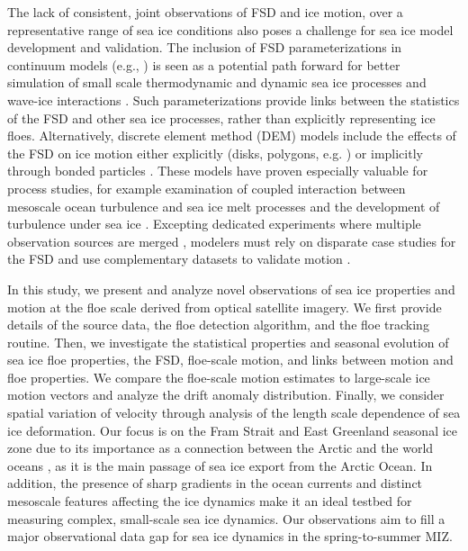 \documentclass[review, jog]{igs}
\begin{document}
The lack of consistent, joint observations of FSD and ice motion, over a representative range of sea ice conditions also poses a challenge for sea ice model development and validation.
The inclusion of FSD parameterizations in continuum models (e.g., \cite{hunke1997_ElasticViscous}) is seen as a potential path forward for better simulation of small scale thermodynamic and dynamic sea ice processes and wave-ice interactions \citep{zhang2015_SeaIce,horvat2015_PrognosticModel, roach2018_EmergentSea, bateson2020_ImpactSea}.
Such parameterizations provide links between the statistics of the FSD and other sea ice processes, rather than explicitly representing ice floes.
Alternatively, discrete element method (DEM) models include the effects of the FSD on ice motion either explicitly (disks, polygons, e.g. \cite{gupta2024_EddyInducedDispersion, damsgaard2018_ApplicationDiscrete, manucharyan2022_SubZeroSea}) or implicitly through bonded particles \citep{astromHighResolutionFractureDynamics2024}.
These models have proven especially valuable for process studies, for example examination of coupled interaction between mesoscale ocean turbulence and sea ice melt processes \citep{gupta2022_RegimesSea} and the development of turbulence under sea ice \citep{brenner2023_ScaleDependentAirSea}.
Excepting dedicated experiments where multiple observation sources are merged \citep[][e.g.]{uttal2002_SHEBA, hwang2017_WintertosummerTransition, rabe2024_MOSAiCDistributed},  modelers must rely on disparate case studies for the FSD \citep{stern2018_ReconcilingDisparate} and use complementary datasets to validate motion \citep{tsarauHighresolutionRegionalSeaice2024}. 

In this study, we present and analyze novel observations of sea ice properties and motion at the floe scale derived from optical satellite imagery. We first provide details of the source data, the floe detection algorithm, and the floe tracking routine. Then, we investigate the statistical properties and seasonal evolution of sea ice floe properties, the FSD, floe-scale motion, and links between motion and floe properties. We compare the floe-scale motion estimates to large-scale ice motion vectors and analyze the drift anomaly distribution. Finally, we consider spatial variation of velocity through analysis of the length scale dependence of sea ice deformation.
Our focus is on the Fram Strait and East Greenland seasonal ice zone due to its importance as a connection between the Arctic and the world oceans \citep{smedsrud2017_FramStrait, sumata2022_UnprecedentedDecline}, as it is the main passage of sea ice export from the Arctic Ocean. 
In addition, the presence of sharp gradients in the ocean currents and distinct mesoscale features affecting the ice dynamics \citep{manley1987_EffectsSub, kozlov2021_EddiesMarginal, morozov2023_EddiesArctic, watkins2023_EvidenceAbrupt} make it an ideal testbed for measuring complex, small-scale sea ice dynamics.
Our observations aim to fill a major observational data gap for sea ice dynamics in the spring-to-summer MIZ.
\end{document}

